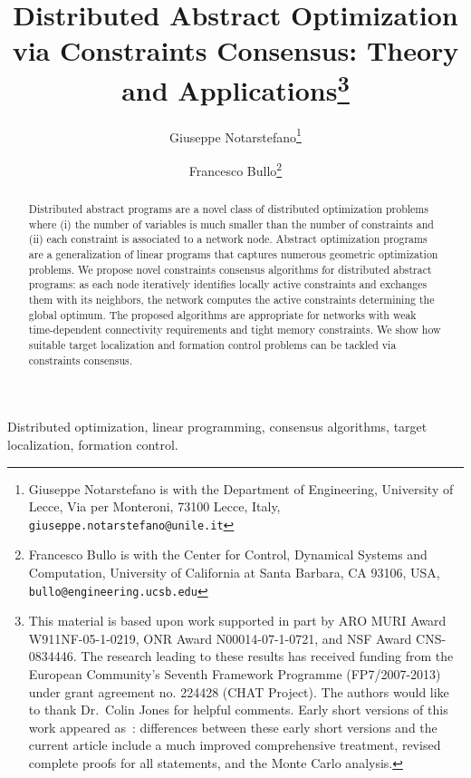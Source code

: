 \documentclass[onecolumn,journal,letterpaper]{IEEEtran}
\begin{document}
\title{Distributed Abstract Optimization via Constraints Consensus: Theory
  and Applications\thanks{This material is based upon work supported in
    part by ARO MURI Award W911NF-05-1-0219, ONR Award N00014-07-1-0721,
    and NSF Award CNS-0834446. The research leading to these results has
    received funding from the European Community's Seventh Framework
    Programme (FP7/2007-2013) under grant agreement no. 224428 (CHAT
    Project). The authors would like to thank Dr.\ Colin Jones for helpful
    comments.
Early short versions of this work appeared
as~\cite{GN-FB:06d,GN-FB:06z,GN-FB:08x}: differences between these early
short versions and the current article include a much improved
comprehensive treatment, revised complete proofs for all statements, and
the Monte Carlo analysis.
}}

\author{Giuseppe Notarstefano\thanks{Giuseppe Notarstefano is with the
    Department of Engineering, University of Lecce, Via per Monteroni,
    73100 Lecce, Italy, \texttt{giuseppe.notarstefano@unile.it}}
  \quad\and\quad Francesco Bullo\thanks{Francesco Bullo is with the Center for Control,
    Dynamical Systems and Computation, University of California at Santa
    Barbara, CA 93106, USA, \texttt{bullo@engineering.ucsb.edu}} }

\maketitle


\begin{abstract}
  Distributed abstract programs are a novel class of distributed
  optimization problems where (i) the number of variables is much smaller
  than the number of constraints and (ii) each constraint is associated to
  a network node. Abstract optimization programs are a generalization of
  linear programs that captures numerous geometric optimization problems.
  We propose novel constraints consensus algorithms for distributed
  abstract programs: as each node iteratively identifies locally active
  constraints and exchanges them with its neighbors, the network computes
  the active constraints determining the global optimum.
The proposed algorithms are appropriate for networks with weak
  time-dependent connectivity requirements and tight memory constraints.
  We show how suitable target localization and formation control problems
  can be tackled via constraints consensus.
\end{abstract}

\begin{IEEEkeywords}
  Distributed optimization, linear programming, consensus algorithms,
  target localization, formation control.
\end{IEEEkeywords}
\end{document}
